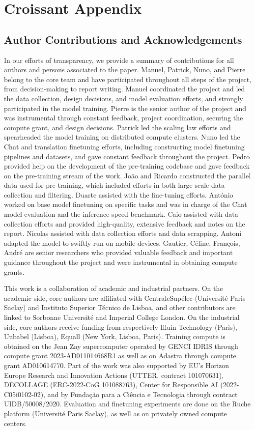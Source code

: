\chapter{Croissant Appendix}


\section*{Author Contributions and Acknowledgements}
In our efforts of transparency, we provide a summary of contributions for all authors and persons associated to the paper. Manuel, Patrick, Nuno, and Pierre belong to the core team and have participated throughout all steps of the project, from decision-making to report writing. Manuel coordinated the project and led the data collection, design decisions, and model evaluation efforts, and strongly participated in the model training. Pierre is the senior author of the project and was instrumental through constant feedback, project coordination, securing the compute grant, and design decisions. Patrick led the scaling law efforts and spearheaded the model training on distributed compute clusters.  Nuno led the Chat and translation finetuning efforts, including constructing model finetuning pipelines and datasets, and gave constant feedback throughout the project. Pedro provided help on the development of the pre-training codebase and gave feedback on the pre-training stream of the work. João and Ricardo constructed the parallel data used for pre-training, which included efforts in both large-scale data collection and filtering. Duarte assisted with the fine-tuning efforts. António worked on base model finetuning on specific tasks and was in charge of the Chat model evaluation and the inference speed benchmark.
Caio assisted with data collection efforts and provided high-quality, extensive feedback and notes on the report. Nicolas assisted with data collection efforts and data scrapping. Antoni adapted the model to swiftly run on mobile devices. Gautier, Céline, François, André are senior researchers who provided valuable feedback and important guidance throughout the project and were instrumental in obtaining compute grants.



This work is a collaboration of academic and industrial partners. On the academic side, core authors are affiliated with CentraleSupélec (Université Paris Saclay) and Instituto Superior Técnico de Lisboa, and other contributors are linked to Sorbonne Université and Imperial College London. On the industrial side, core authors receive funding from respectively Illuin Technology (Paris), Unbabel (Lisboa), Equall (New York, Lisboa, Paris). Training compute is obtained on the Jean Zay supercomputer operated by GENCI IDRIS through compute grant 2023-AD011014668R1 as well as on Adastra through compute grant AD010614770. 
Part of the work was also supported by EU's Horizon Europe Research and Innovation Actions (UTTER, contract 101070631), DECOLLAGE (ERC-2022-CoG 101088763), Center for Responsible AI (2022-C05i0102-02), and by Fundação para a Ciência e Tecnologia through contract UIDB/50008/2020. 
Evaluation and finetuning experiments are done on the Ruche platform (Université Paris Saclay), as well as on privately owned compute centers.

